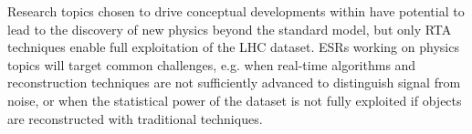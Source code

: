 
\noindent {\color{blue}{2. The \acronym program of searches and measurement could
lead to breakthroughs in our understanding of nature}}
Research topics chosen to drive conceptual developments
within \acronym have potential to lead to 
the discovery of new physics beyond the standard model, but only RTA techniques enable
full exploitation of the LHC dataset. 
ESRs working on physics topics will target common challenges, e.g. 
when real-time algorithms and reconstruction techniques are not sufficiently 
advanced to distinguish signal from noise, 
or when the statistical power of the dataset is not fully
exploited if objects are reconstructed with traditional techniques. 

